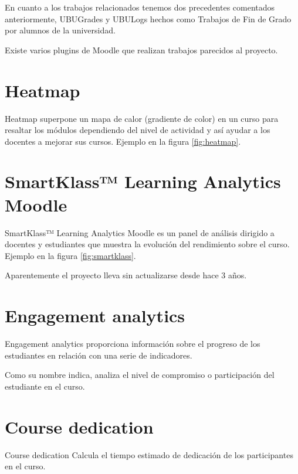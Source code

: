 
En cuanto a los trabajos relacionados tenemos dos precedentes comentados anteriormente, UBUGrades y UBULogs hechos como Trabajos de Fin de Grado por alumnos de la universidad.

Existe varios plugins de Moodle que realizan trabajos parecidos al proyecto.

\section{Heatmap}

Heatmap\cite{noauthor_moodle_nodate-2} superpone un mapa de calor (gradiente de color) en un curso para resaltar los módulos dependiendo del nivel de actividad y así ayudar a los docentes a mejorar sus cursos. Ejemplo en la figura \ref{fig:heatmap}.


\section{SmartKlass™ Learning Analytics Moodle}
SmartKlass™ Learning Analytics Moodle \cite{noauthor_moodle_nodate-3} es un panel de análisis dirigido a docentes y estudiantes que muestra la evolución del rendimiento sobre el curso. Ejemplo en la figura \ref{fig:smartklass}.

Aparentemente el proyecto lleva sin actualizarse desde hace 3 años\cite{noauthor_klassdata/moodle-local_smart_klass:_nodate}.


\section{Engagement analytics}

Engagement analytics \cite{noauthor_moodle_nodate-4} proporciona información sobre el progreso de los estudiantes en relación con una serie de indicadores.

Como su nombre indica, analiza el nivel de compromiso o participación del estudiante en el curso.

\section{Course dedication}

Course dedication \cite{noauthor_moodle_nodate-5} Calcula el tiempo estimado de dedicación de los participantes en el curso.



